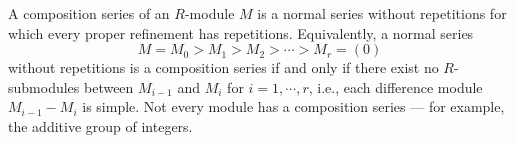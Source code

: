 A composition series of an $R$-module $M$ is a normal series without repetitions for which every proper refinement has repetitions. Equivalently, a normal series
$$M = M_0 > M_1 > M_2 > \cdots > M_r = (0)$$
without repetitions is a composition series if and only if there exist no $R$-submodules between $M_{i-1}$ and $M_i$ for $i = 1, \cdots, r$, i.e., each difference module $M_{i-1} - M_i$ is simple. Not every module has a composition series — for example, the additive group of integers.

